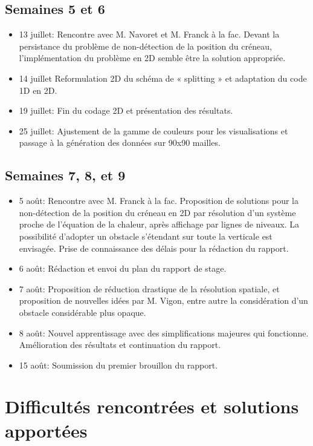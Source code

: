 \subsection{Semaines 5 et 6}

\begin{itemize}
 \item 13 juillet: Rencontre avec M. Navoret et M. Franck à la fac. Devant la persistance du problème de non-détection de la position du créneau, l'implémentation du problème en 2D semble être la solution appropriée.
 \item 14 juillet Reformulation 2D du schéma de « splitting » et adaptation du code 1D en 2D.
 \item 19 juillet: Fin du codage 2D et présentation des résultats.
 \item 25 juillet: Ajustement de la gamme de couleurs pour les visualisations et passage à la génération des données sur 90x90 mailles.
\end{itemize}

\subsection{Semaines 7, 8, et 9}
\begin{itemize}
 \item 5 août: Rencontre avec M. Franck à la fac. Proposition de solutions pour la non-détection de la position du créneau en 2D par résolution d'un système proche de l'équation de la chaleur, après affichage par lignes de niveaux. La possibilité d'adopter un obstacle s'étendant sur toute la verticale est envisagée. Prise de connaissance des délais pour la rédaction du rapport.
 \item 6 août: Rédaction et envoi du plan du rapport de stage. 
 \item 7 août: Proposition de réduction drastique de la résolution spatiale, et proposition de nouvelles idées par M. Vigon, entre autre la considération d'un obstacle considérable plus opaque.
 \item 8 août: Nouvel apprentissage avec des simplifications majeures qui fonctionne. Amélioration des résultats et continuation du rapport.
 \item 15 août: Soumission du premier brouillon du rapport.
\end{itemize}

\section{Difficultés rencontrées et solutions apportées}

